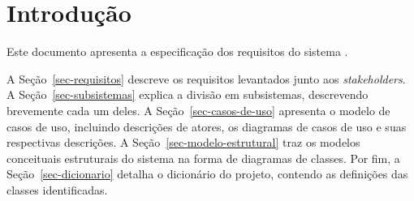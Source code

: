 \chapter{Introdução}
\label{sec-intro}
\vspace{-1cm}

Este documento apresenta a especificação dos requisitos do sistema \emph{\imprimirtitulo}.


A Seção~\ref{sec-requisitos} descreve os requisitos levantados junto aos \textit{stakeholders}.
A Seção~\ref{sec-subsistemas} explica a divisão em subsistemas, descrevendo brevemente cada um deles. 
A Seção~\ref{sec-casos-de-uso} apresenta o modelo de casos de uso, incluindo descrições de atores, os diagramas de casos de uso e suas respectivas descrições. 
A Seção~\ref{sec-modelo-estrutural} traz os modelos conceituais estruturais do sistema na forma de diagramas de classes.  Por fim, a Seção~\ref{sec-dicionario} detalha o dicionário do projeto, contendo as definições das classes identificadas.

